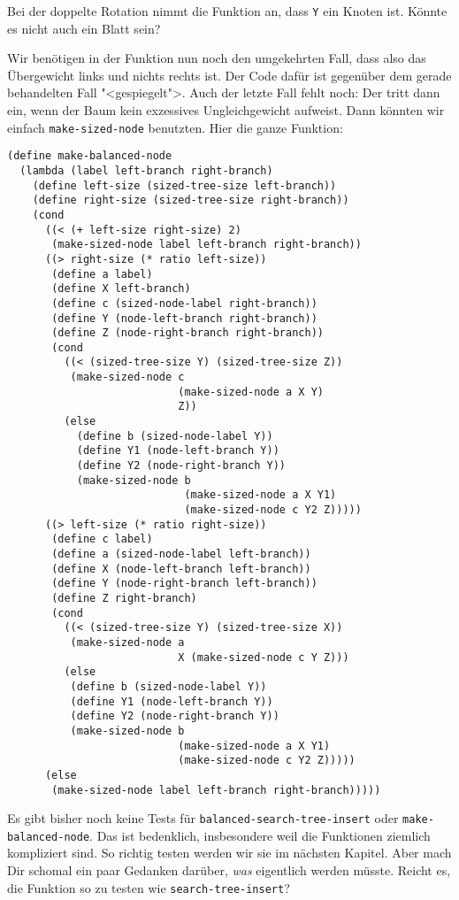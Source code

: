%
\begin{aufgabeinline}
  Bei der doppelte Rotation nimmt die Funktion an, dass \lstinline{Y}
  ein Knoten ist.  Könnte es nicht auch ein Blatt sein?
\end{aufgabeinline}
%
Wir benötigen in der Funktion nun noch den umgekehrten Fall, dass also
das Übergewicht links und nichts rechts ist.  Der Code dafür ist
gegenüber dem gerade behandelten Fall "<gespiegelt">.  Auch der letzte
Fall fehlt noch: Der tritt dann ein,  wenn der Baum kein exzessives
Ungleichgewicht aufweist.  Dann könnten wir einfach
\lstinline{make-sized-node} benutzten.  Hier die ganze Funktion:
%
\begin{lstlisting}
(define make-balanced-node
  (lambda (label left-branch right-branch)
    (define left-size (sized-tree-size left-branch))
    (define right-size (sized-tree-size right-branch))
    (cond
      ((< (+ left-size right-size) 2)
       (make-sized-node label left-branch right-branch))
      ((> right-size (* ratio left-size))
       (define a label)
       (define X left-branch)
       (define c (sized-node-label right-branch))
       (define Y (node-left-branch right-branch))
       (define Z (node-right-branch right-branch))
       (cond
         ((< (sized-tree-size Y) (sized-tree-size Z))
          (make-sized-node c
                           (make-sized-node a X Y)
                           Z))
         (else
           (define b (sized-node-label Y))
           (define Y1 (node-left-branch Y))
           (define Y2 (node-right-branch Y))
           (make-sized-node b
                            (make-sized-node a X Y1)
                            (make-sized-node c Y2 Z)))))
      ((> left-size (* ratio right-size))
       (define c label)
       (define a (sized-node-label left-branch))
       (define X (node-left-branch left-branch))
       (define Y (node-right-branch left-branch))
       (define Z right-branch)
       (cond
         ((< (sized-tree-size Y) (sized-tree-size X))
          (make-sized-node a
                           X (make-sized-node c Y Z)))
         (else
          (define b (sized-node-label Y))
          (define Y1 (node-left-branch Y))
          (define Y2 (node-right-branch Y))
          (make-sized-node b
                           (make-sized-node a X Y1)
                           (make-sized-node c Y2 Z)))))
      (else
       (make-sized-node label left-branch right-branch)))))
\end{lstlisting}
%
\begin{aufgabeinline}
  Es gibt bisher noch keine Tests für
  \lstinline{balanced-search-tree-insert} oder
  \lstinline{make-balanced-node}.  Das ist bedenklich, insbesondere
  weil die Funktionen ziemlich kompliziert sind.  So richtig testen
  werden wir sie im nächsten Kapitel.  Aber mach Dir schomal ein paar
  Gedanken darüber, \emph{was} eigentlich werden müsste.  Reicht es,
  die Funktion so zu testen wie \lstinline{search-tree-insert}?
\end{aufgabeinline}

